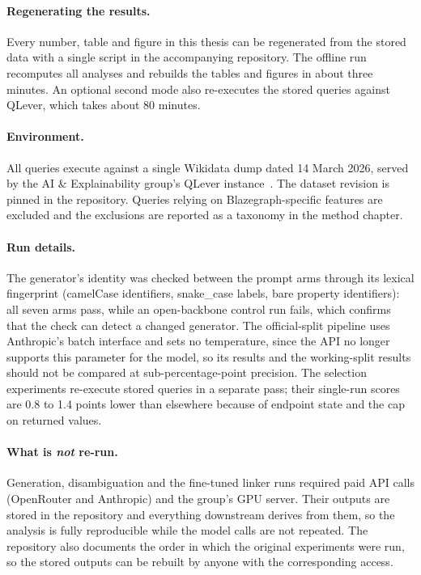 \paragraph{Regenerating the results.} Every number, table and figure in this thesis can be regenerated from the stored data with a single script in the accompanying repository.
The offline run recomputes all analyses and rebuilds the tables and figures in about three minutes.
An optional second mode also re-executes the stored queries against QLever, which takes about 80 minutes.

\paragraph{Environment.} All queries execute against a single Wikidata dump dated
14 March 2026, served by the AI \& Explainability group's QLever instance~\parencite{bast2017qlever}.
The dataset revision is pinned in the repository.
Queries relying on Blazegraph-specific features are excluded and the exclusions are reported as a taxonomy in the method chapter.

\paragraph{Run details.} The generator's identity was checked between the prompt arms through its lexical fingerprint (camelCase identifiers, snake\_case labels, bare property identifiers): all seven arms pass, while an open-backbone control run fails, which confirms that the check can detect a changed generator.
The official-split pipeline uses Anthropic's batch interface and sets no temperature, since the API no longer supports this parameter for the model, so its results and the working-split results should not be compared at sub-percentage-point precision.
The selection experiments re-execute stored queries in a separate pass; their single-run scores are 0.8 to 1.4 points lower than elsewhere because of endpoint state and the cap on returned values.

\paragraph{What is \emph{not} re-run.} Generation, disambiguation and the
fine-tuned linker runs required paid API calls (OpenRouter and Anthropic) and the group's GPU server.
Their outputs are stored in the repository and everything downstream derives from them, so the analysis is fully reproducible while the model calls are not repeated.
The repository also documents the order in which the original experiments were run, so the stored outputs can be rebuilt by anyone with the corresponding access.


